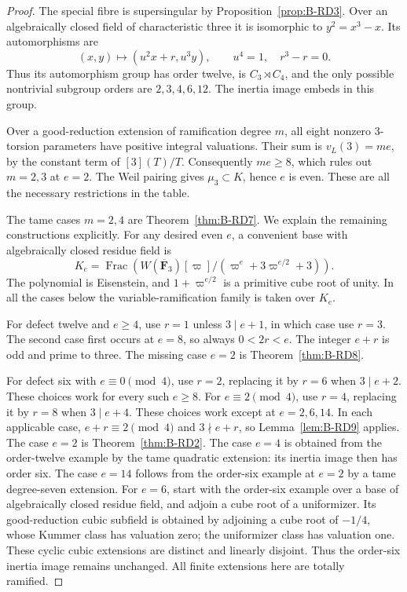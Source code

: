 \begin{proof}
The special fibre is supersingular by Proposition~\ref{prop:B-RD3}.
Over an algebraically closed field of characteristic three it is
isomorphic to $y^2=x^3-x$. Its automorphisms are
\[
 (x,y)\longmapsto(u^2x+r,u^3y),\qquad
 u^4=1,\quad r^3-r=0.
\]
Thus its automorphism group has order twelve, is $C_3\rtimes C_4$,
and the only possible nontrivial subgroup orders are $2,3,4,6,12$.
The inertia image embeds in this group.

Over a good-reduction extension of ramification degree $m$, all eight
nonzero $3$-torsion parameters have positive integral valuations.
Their sum is $v_L(3)=me$, by the constant term of $[3](T)/T$.
Consequently $me\geq8$, which rules out $m=2,3$ at $e=2$.
The Weil pairing gives $\mu_3\subset K$, hence $e$ is even.
These are all the necessary restrictions in the table.

The tame cases $m=2,4$ are Theorem~\ref{thm:B-RD7}.
We explain the remaining constructions explicitly. For any desired
even $e$, a convenient base with algebraically closed residue field is
\[
 K_e=\operatorname{Frac}\left(
 W(\overline{\mathbf F}_3)[\varpi]/
 (\varpi^e+3\varpi^{e/2}+3)\right).
\]
The polynomial is Eisenstein, and $1+\varpi^{e/2}$ is a primitive
cube root of unity. In all the cases below the variable-ramification
family is taken over $K_e$.

For defect twelve and $e\geq4$, use $r=1$ unless $3\mid e+1$, in
which case use $r=3$. The second case first occurs at $e=8$, so always
$0<2r<e$. The integer $e+r$ is odd and prime to three. The missing
case $e=2$ is Theorem~\ref{thm:B-RD8}.

For defect six with $e\equiv0\pmod4$, use $r=2$, replacing it by
$r=6$ when $3\mid e+2$. These choices work for every such $e\geq8$.
For $e\equiv2\pmod4$, use $r=4$, replacing it by $r=8$ when
$3\mid e+4$. These choices work except at $e=2,6,14$.
In each applicable case, $e+r\equiv2\pmod4$ and $3\nmid e+r$,
so Lemma~\ref{lem:B-RD9} applies. The case $e=2$ is
Theorem~\ref{thm:B-RD2}. The case $e=4$ is obtained from the
order-twelve example by the tame quadratic extension: its inertia
image then has order six. The case $e=14$ follows from the order-six
example at $e=2$ by a tame degree-seven extension.
For $e=6$, start with the order-six example over a base of algebraically
closed residue field, and adjoin a cube root of a uniformizer.
Its good-reduction cubic subfield is obtained by adjoining a cube root
of $-1/4$, whose Kummer class has valuation zero; the uniformizer class
has valuation one. These cyclic cubic extensions are distinct and
linearly disjoint. Thus the order-six inertia image remains unchanged.
All finite extensions here are totally ramified.


\end{proof}
